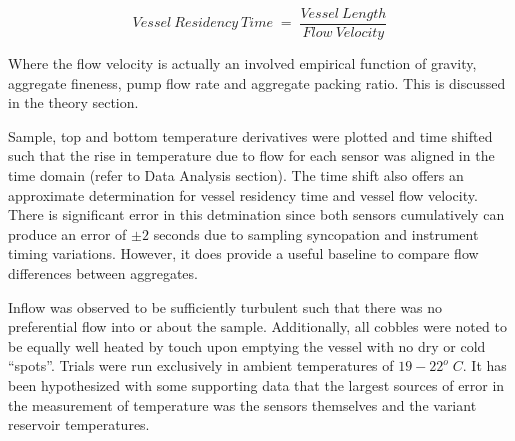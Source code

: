 \documentclass[12pt]{article}
\numberwithin{equation}{section}
\numberwithin{table}{section}
\numberwithin{figure}{section}
\begin{document}
\[Vessel\:Residency\:Time\;=\;\frac{Vessel\:Length}{Flow\:Velocity}\]

\noindent Where the flow velocity is actually an involved empirical function of gravity, aggregate fineness, pump flow rate and aggregate packing ratio. This is discussed in the theory section. 

Sample, top and bottom temperature derivatives were plotted and time shifted such that the rise in temperature due to flow for each sensor was aligned in the time domain (refer to Data Analysis section). The time shift also offers an approximate determination for vessel residency time and vessel flow velocity. There is significant error in this detmination since both sensors cumulatively can produce an error of $\pm2$ seconds due to sampling syncopation and instrument timing variations. However, it does provide a useful baseline to compare flow differences between aggregates. 

Inflow was observed to be sufficiently turbulent such that there was no preferential flow into or about the sample. Additionally, all cobbles were noted to be equally well heated by touch upon emptying the vessel with no dry or cold ``spots''. Trials were run exclusively in ambient temperatures of $19-22^{o}\;C$. It has been hypothesized with some supporting data that the largest sources of error in the measurement of temperature was the sensors themselves and the variant reservoir temperatures.
%
%
%

%

% 
%
%
%
%
%
%


%
\end{document}
